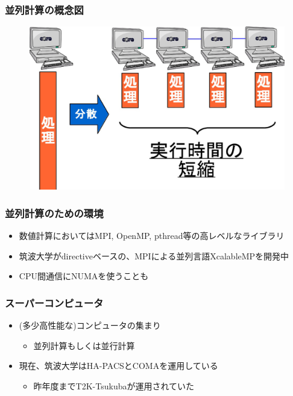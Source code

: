 \documentclass[dvipdfmx,20pt,notheorems,t]{beamer}
\begin{document}
\begin{frame}\frametitle{並列計算の概念図}
\begin{figure}[htb]
\centering
\includegraphics[width=\textwidth]{master-worker.eps}
\end{figure}
\end{frame}

\begin{frame}\frametitle{並列計算のための環境}
\begin{itemize}
\item 数値計算においてはMPI, OpenMP, pthread等の高レベルなライブラリ
\item 筑波大学がdirectiveベースの、MPIによる並列言語XcalableMPを開発中
\item CPU間通信にNUMAを使うことも
\end{itemize}
\end{frame}

\begin{frame}\frametitle{スーパーコンピュータ}
\begin{itemize}
\item (多少高性能な)コンピュータの集まり
\begin{itemize}
\item 並列計算もしくは並行計算
\end{itemize}
\item 現在、筑波大学はHA-PACSとCOMAを運用している
\begin{itemize}
\item 昨年度までT2K-Tsukubaが運用されていた
\end{itemize}
\end{itemize}
\end{frame}
\end{document}
